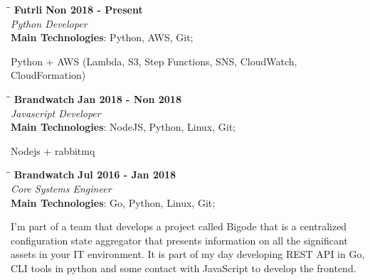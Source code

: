 \documentclass[margin]{res}
\begin{document}
\begin{resume}
\vspace{-0.1in}
   \begin{tabbing}
   \hspace{2.3in}\= \hspace{1.7in}\= \kill %
    \textbf{Futrli}    \>\>\textbf{Non 2018 - Present}\\
    \textit{Python Developer}\\        
    \textbf{Main Technologies}: Python, AWS, Git;
   \end{tabbing}\vspace{-20pt}      %
    \vspace{2mm}
Python + AWS (Lambda, S3, Step Functions, SNS, CloudWatch, CloudFormation)

\vspace{-0.1in}
   \begin{tabbing}
   \hspace{2.3in}\= \hspace{1.7in}\= \kill %
    \textbf{Brandwatch}    \>\>\textbf{Jan 2018 - Non 2018}\\
    \textit{Javascript Developer}\\        
    \textbf{Main Technologies}: NodeJS, Python, Linux, Git;
   \end{tabbing}\vspace{-20pt}      %
    \vspace{2mm}
Nodejs + rabbitmq

\vspace{-0.1in}
   \begin{tabbing}
   \hspace{2.3in}\= \hspace{1.7in}\= \kill %
    \textbf{Brandwatch}    \>\>\textbf{Jul 2016 - Jan 2018}\\
    \textit{Core Systems Engineer}\\        
    \textbf{Main Technologies}: Go, Python, Linux, Git;
   \end{tabbing}\vspace{-20pt}      %
    \vspace{2mm}
I'm part of a team that develops a project called Bigode that is a centralized configuration state aggregator that presents information on all the significant assets in your IT environment. It is part of my day developing REST API  in Go, CLI tools in python and some contact with JavaScript to develop the frontend.


\end{resume}
\end{document}
